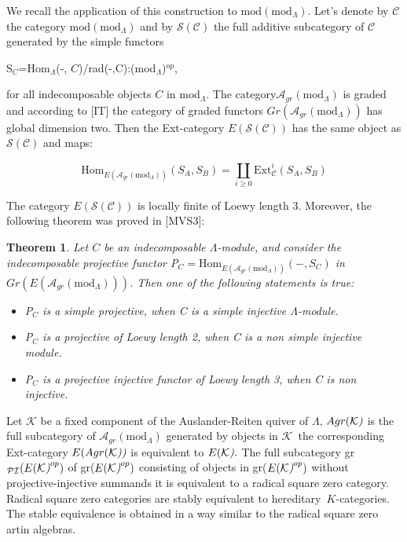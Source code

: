 \documentclass{amsart}
\newtheorem{theorem}{Theorem}
\theoremstyle{plain}
\numberwithin{equation}{section}
\begin{document}
We recall the application of this construction to $\mathrm{mod}(\mathrm{mod}_{\Lambda })$. Let's denote by $\mathcal{C}$ the category $\mathrm{mod}(\mathrm{mod}_{\Lambda })$ and by $\mathcal{S(C)}$ the full additive
subcategory of $\mathcal{C}$ generated by the simple functors

\begin{center}
S$_{C}$=Hom$_{\Lambda }$(-, $C$)/rad(-,C):(mod$_{\Lambda }$)$^{op}$,
\end{center}

for all indecomposable objects $C$ in $\mathrm{mod}_{\Lambda }$. The category$\mathcal{A}_{gr}(\mathrm{mod}_{\Lambda })$ is graded and according to [IT]
the category of graded functors $Gr(\mathcal{A}_{gr}(\mathrm{mod}_{\Lambda
}))$ has global dimension two. Then the Ext-category $E(\mathcal{S(C)})$ has
the same object as $\mathcal{S(C)}$ and maps:

\begin{equation*}
\mathrm{Hom}_{E(\mathcal{A}_{gr}(\mathrm{mod}_{\Lambda }))}(S_{A},S_{B})=
\coprod_{i\ge 0}\mathrm{Ext}_\mathcal{C}^i(S_{A},S_{B})
\end{equation*}

The category $E(\mathcal{S(C)})$ is locally finite of Loewy length 3.
Moreover, the following theorem was proved in [MVS3]:

\begin{theorem}
Let $C$ be an indecomposable $\Lambda $-module, and consider the
indecomposable projective functor P$_{C}=\mathrm{Hom}_{E(\mathcal{A}_{gr}(\mathrm{mod}_{\Lambda }))}(-,S_{C})$ in $Gr(E(\mathcal{A}_{gr}(\mathrm{mod}_{\Lambda })))$. Then one of the following statements is true:

\begin{itemize}
\item[(i)] P$_{C}$ is a simple projective, when C is a simple injective $\Lambda $-module.

\item[(ii)] P$_{C}$ is a projective of Loewy length 2, when C is a non
simple injective module.

\item[(iii)] P$_{C}$ is a projective injective functor of Loewy length 3,
when C is non injective.
\end{itemize}
\end{theorem}

Let $\mathcal{K}$ be a fixed component of the Auslander-Reiten quiver of $\Lambda $, $Agr(\mathcal{K}\emph{)}$ is the full subcategory of $\mathcal{A}_{gr}(\mathrm{mod}_{\Lambda })$ generated by objects in $\mathcal{K}$\emph{\
}the corresponding Ext-category $E(Agr(\mathcal{K}\emph{))}$ is equivalent
to $E(\mathcal{K}\emph{).}$ The full subcategory gr$_{\mathcal{PI}}(E(\mathcal{K}\emph{)}^{op})$ of gr($E(\mathcal{K}\emph{)}^{op})$ consisting of
objects in gr($E(\mathcal{K}\emph{)}^{op})$ without projective-injective
summands it is equivalent to a radical square zero category. Radical square
zero categories are stably equivalent to hereditary\textsl{\ }$K$-categories. The stable equivalence is obtained in a way similar to the
radical square zero artin algebras.
\end{document}
